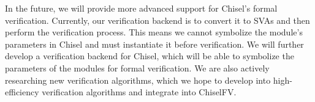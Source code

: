 \documentclass[conference]{IEEEtran}
\theoremstyle{definition}
\begin{document}
In the future, we will provide more advanced support for Chisel's formal verification. Currently, our verification backend is to convert it to SVAs and then perform the verification process. This means we cannot symbolize the module's parameters in Chisel and must instantiate it before verification. We will further develop a verification backend for Chisel, which will be able to symbolize the parameters of the modules for formal verification. We are also actively researching new verification algorithms, which we hope to develop into high-efficiency verification algorithms and integrate into ChiselFV.






\end{document}
